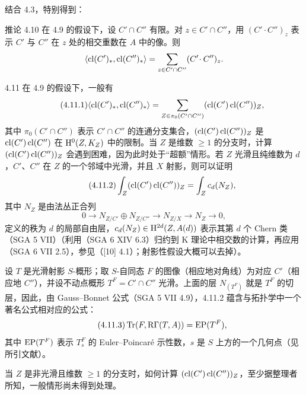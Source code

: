 结合 4.3，特别得到：

\begin{statement}{推论 4.10}
在 4.9 的假设下，设 $C'\cap C''$ 有限。对 $z\in C'\cap C''$，用 $(C'\!\cdot C'')_z$ 表示 $C'$ 与 $C''$ 在 $z$ 处的相交重数在 $A$ 中的像。则
\[
\langle \operatorname{cl}(C')_*,\operatorname{cl}(C'')_*\rangle
=
\sum_{z\in C'\cap C''}(C'\!\cdot C'')_z.
\]
\end{statement}

\begin{statement}{4.11}
在 4.9 的假设下，一般有
\begin{equation}
\tag{4.11.1}
\langle \operatorname{cl}(C')_*,\operatorname{cl}(C'')_*\rangle
=
\sum_{Z\in\pi_0(C'\cap C'')}(\operatorname{cl}(C')\operatorname{cl}(C''))_Z,
\end{equation}
其中 $\pi_0(C'\cap C'')$ 表示 $C'\cap C''$ 的连通分支集合，$(\operatorname{cl}(C')\operatorname{cl}(C''))_Z$ 是 $\operatorname{cl}(C')\operatorname{cl}(C'')$ 在 $\mathrm{H}^0(Z,K_Z)$ 中的限制。当 $Z$ 是维数 $\geq 1$ 的分支时，计算 $(\operatorname{cl}(C')\operatorname{cl}(C''))_Z$ 会遇到困难，因为此时处于“超额”情形。若 $Z$ 光滑且纯维数为 $d$，$C'$、$C''$ 在 $Z$ 的一个邻域中光滑，并且 $X$ 射影，则可以证明
\begin{equation}
\tag{4.11.2}
\int_Z(\operatorname{cl}(C')\operatorname{cl}(C''))_Z=\int_Z c_d(N_Z),
\end{equation}
其中 $N_Z$ 是由法丛正合列
\[
0\longrightarrow N_{Z/C'}\oplus N_{Z/C''}\longrightarrow N_{Z/X}\longrightarrow N_Z\longrightarrow 0,
\]
定义的秩为 $d$ 的局部自由层，$c_d(N_Z)\in \mathrm{H}^{2d}(Z,A(d))$ 表示其第 $d$ 个 Chern 类（SGA 5 VII）（利用（SGA 6 XIV 6.3）归约到 K 理论中相交数的计算，再应用（SGA 6 VII 2.5），参见（[10] 4.1）；射影性假设大概可以去掉）。

设 $T$ 是光滑射影 $S$-概形；取 $S$-自同态 $F$ 的图像（相应地对角线）为对应 $C'$（相应地 $C''$），并设不动点概形 $T^F=C'\cap C''$ 光滑。上面的层 $N_{(T^F)}$ 就是 $T^F$ 的切层，因此，由 Gauss--Bonnet 公式（SGA 5 VII 4.9），4.11.2 蕴含与拓扑学中一个著名公式相对应的公式：
\begin{equation}
\tag{4.11.3}
\operatorname{Tr}(F,\mathrm R\Gamma(T,A))=\operatorname{EP}(T^F),
\end{equation}
其中 $\operatorname{EP}(T^F)$ 表示 $T_s^F$ 的 Euler--Poincaré 示性数，$s$ 是 $S$ 上方的一个几何点（见所引文献）。
\end{statement}

当 $Z$ 是非光滑且维数 $\geq 1$ 的分支时，如何计算 $(\operatorname{cl}(C')\operatorname{cl}(C''))_Z$，至少据整理者所知，一般情形尚未得到处理。

